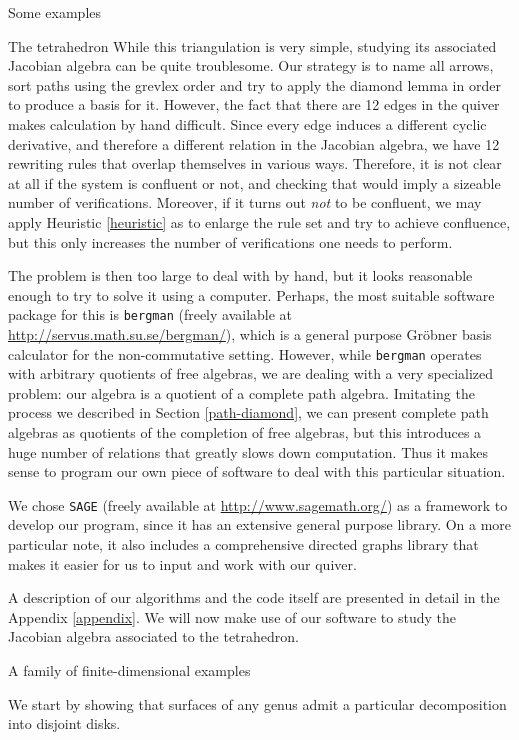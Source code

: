 \begin{chapter}{Some examples}
\begin{section}{The tetrahedron}
While this triangulation is very simple, studying its associated Jacobian algebra can be quite troublesome. Our strategy is to name all arrows, sort paths using the grevlex order and try to apply the diamond lemma in order to produce a basis for it. However, the fact that there are 12 edges in the quiver makes calculation by hand difficult. Since every edge induces a different cyclic derivative, and therefore a different relation in the Jacobian algebra, we have 12 rewriting rules that overlap themselves in various ways. Therefore, it is not clear at all if the system is confluent or not, and checking that would imply a sizeable number of verifications. Moreover, if it turns out \emph{not} to be confluent, we may apply Heuristic \ref{heuristic} as to enlarge the rule set and try to achieve confluence, but this only increases the number of verifications one needs to perform.

The problem is then too large to deal with by hand, but it looks reasonable enough to try to solve it using a computer. Perhaps, the most suitable software package for this is \texttt{bergman} (freely available at \url{http://servus.math.su.se/bergman/}), which is a general purpose Gröbner basis calculator for the non-commutative setting. However, while \texttt{bergman} operates with arbitrary quotients of free algebras, we are dealing with a very specialized problem: our algebra is a quotient of a complete path algebra. Imitating the process we described in Section \ref{path-diamond}, we can present complete path algebras as quotients of the completion of free algebras, but this introduces a huge number of relations that greatly slows down computation. Thus it makes sense to program our own piece of software to deal with this particular situation.

We chose \texttt{SAGE} (freely available at \url{http://www.sagemath.org/}) as a framework to develop our program, since it has an extensive general purpose library. On a more particular note, it also includes a comprehensive directed graphs library that makes it easier for us to input and work with our quiver.

A description of our algorithms and the code itself are presented in detail in the Appendix \ref{appendix}. We will now make use of our software to study the Jacobian algebra associated to the tetrahedron.
\end{section}
\begin{section}{A family of finite-dimensional examples}

We start by showing that surfaces of any genus admit a particular decomposition into disjoint disks.


\end{section}
\end{chapter}
